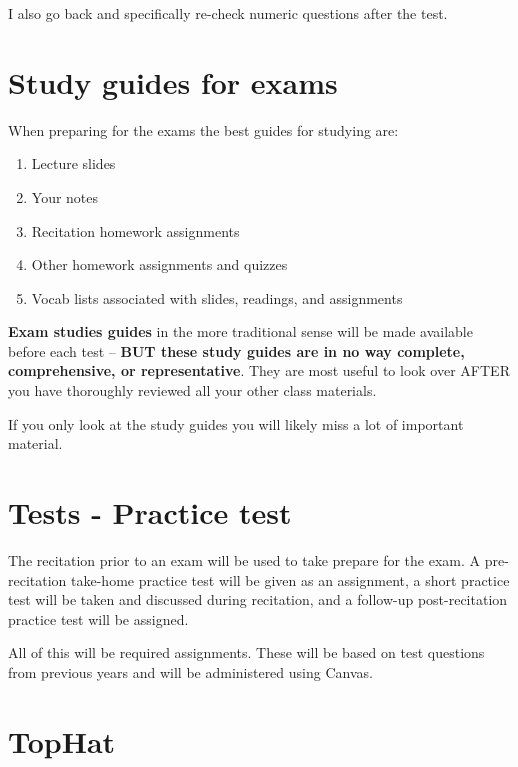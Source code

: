 \documentclass[
]{book}
\providecommand{\tightlist}{%
  \setlength{\itemsep}{0pt}\setlength{\parskip}{0pt}}
\begin{document}
I also go back and specifically re-check numeric questions after the test.

\hypertarget{study-guides-for-exams}{%
\chapter{Study guides for exams}\label{study-guides-for-exams}}

When preparing for the exams the best guides for studying are:

\begin{enumerate}
\def\labelenumi{\arabic{enumi}.}
\tightlist
\item
  Lecture slides
\item
  Your notes
\item
  Recitation homework assignments
\item
  Other homework assignments and quizzes
\item
  Vocab lists associated with slides, readings, and assignments
\end{enumerate}

\textbf{Exam studies guides} in the more traditional sense will be made available before each test -- \textbf{BUT these study guides are in no way complete, comprehensive, or representative}. They are most useful to look over AFTER you have thoroughly reviewed all your other class materials.

If you only look at the study guides you will likely miss a lot of important material.

\hypertarget{tests---practice-test}{%
\chapter{Tests - Practice test}\label{tests---practice-test}}

The recitation prior to an exam will be used to take prepare for the exam. A pre-recitation take-home practice test will be given as an assignment, a short practice test will be taken and discussed during recitation, and a follow-up post-recitation practice test will be assigned.

All of this will be required assignments. These will be based on test questions from previous years and will be administered using Canvas.

\hypertarget{tophat}{%
\chapter{TopHat}\label{tophat}}
\end{document}
